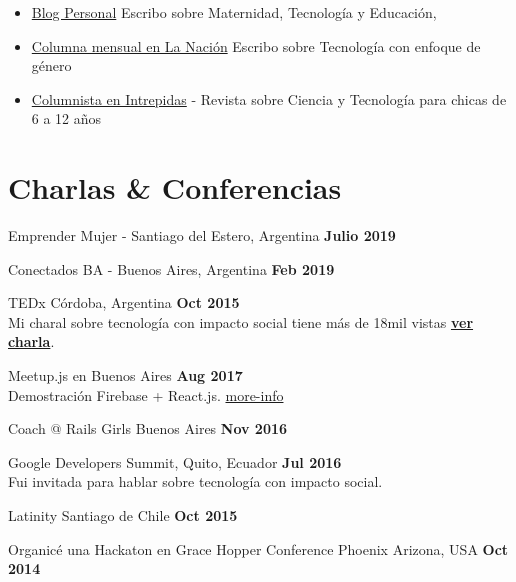 \documentclass[margin,line]{resume}
\begin{document}
\begin{resume}
\begin{itemize}
\item \href{https://medium.com/@carohadad} {Blog Personal}  Escribo sobre Maternidad, Tecnología y Educación,
\item \href{http://www.lanacion.com.ar/autor/carolina-hadad-10522} {Columna mensual en La Naci\'on} Escribo sobre Tecnología con enfoque de género
\item \href{https://www.intrepidas.com.ar/} {Columnista en Intrepidas} - Revista sobre Ciencia y Tecnología para chicas de 6 a 12 años
\end{itemize}






\section{\mysidestyle Charlas \& Conferencias}

\begin{list2}
\item Emprender Mujer - Santiago del Estero, Argentina \hfill \textbf{Julio 2019}  
\item Conectados BA - Buenos Aires, Argentina \hfill \textbf{Feb 2019}  

\item  TEDx C\'ordoba, Argentina \hfill \textbf{Oct 2015}  \\
Mi charal sobre tecnología con impacto social tiene más de 18mil vistas \href{https://www.youtube.com/watch?v=0cx8UwdN-g4&t=1s}{\textbf{ver charla}}.


\item Meetup.js en Buenos Aires \hfill \textbf{Aug 2017}
\\
Demostración Firebase + React.js. \href{https://www.meetup.com/Meetup-js/events/242439836/?eventId=242439836}{more-info}


\item Coach  @ Rails Girls Buenos Aires \hfill \textbf{Nov 2016}

\item  Google Developers Summit, Quito, Ecuador \hfill \textbf{Jul 2016}  \\
Fui invitada para hablar sobre tecnología con impacto social.
\item  Latinity Santiago de Chile \textbf{Oct 2015}

\item Organicé una Hackaton en Grace Hopper Conference Phoenix Arizona, USA \hfill \textbf{Oct 2014} 

\end{list2}



    

\end{resume}
\end{document}
